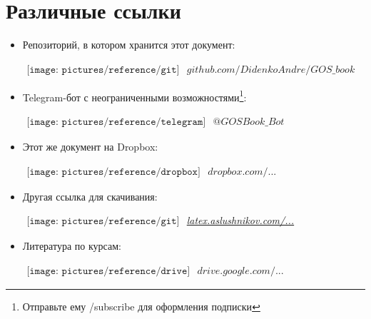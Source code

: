 {\let\clearpage\relax\chapter{Различные ссылки}}
\begin{itemize}
\item

Репозиторий, в котором хранится этот документ:

$
\begin{array}{l}
\texttt{[image: pictures/reference/git]}
\end{array}
$ \href{https://github.com/DidenkoAndre/GOS_book}{$github.com/DidenkoAndre/GOS\_book$}

\item

Telegram-бот с неограниченными возможностями\footnote{Отправьте ему \textsf{/subscribe} для оформления подписки}:

$
\begin{array}{l}
\texttt{[image: pictures/reference/telegram]}
\end{array}
$
\href{https://t.me/GOSBook_Bot}{\textcolor{Purplemountainmajesty}{$@GOSBook\_Bot$}} 

\item

Этот же документ на Dropbox:

$
\begin{array}{l}
\texttt{[image: pictures/reference/dropbox]}
\end{array}
$ \href{https://www.dropbox.com/sh/7e5mfj8q68o2ipp/AAD8XvpZhiJzFbEh_IeH305ia?dl=0&preview=GOSBook.pdf}{$dropbox.com/...$}

\item 

Другая ссылка для скачивания:

$
\begin{array}{l}
\texttt{[image: pictures/reference/git]}
\end{array}
$
\href{http://latex.aslushnikov.com/compile?git=https://github.com/DidenkoAndre/GOS_book&target=_main.tex}{\large \textcolor{Purplemountainmajesty}{\textit{latex.aslushnikov.com/...}}}

\item
Литература по курсам:

$
\begin{array}{l}
\texttt{[image: pictures/reference/drive]}
\end{array}
$
\href{https://drive.google.com/drive/u/0/folders/0BzuzEyNkpwYDcENXcV9jNWdwVlU}{$drive.google.com/...$}


\end{itemize}
